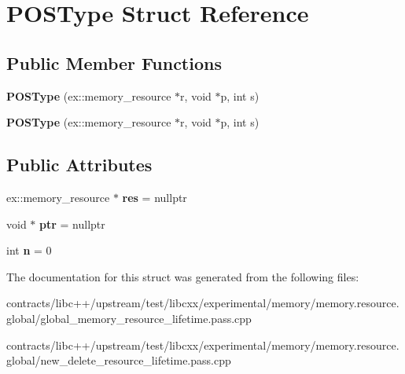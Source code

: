 \hypertarget{struct_p_o_s_type}{}\section{P\+O\+S\+Type Struct Reference}
\label{struct_p_o_s_type}
\subsection*{Public Member Functions}
\begin{DoxyCompactItemize}
\item 
\mbox{\label{struct_p_o_s_type_a861c65273f916b01d18f6bb990455d1d}} 
{\bfseries P\+O\+S\+Type} (ex\+::memory\+\_\+resource $\ast$r, void $\ast$p, int s)
\item 
\mbox{\label{struct_p_o_s_type_a861c65273f916b01d18f6bb990455d1d}} 
{\bfseries P\+O\+S\+Type} (ex\+::memory\+\_\+resource $\ast$r, void $\ast$p, int s)
\end{DoxyCompactItemize}
\subsection*{Public Attributes}
\begin{DoxyCompactItemize}
\item 
\mbox{\label{struct_p_o_s_type_a0861cbc4e2c25fa489d199d41638d366}} 
ex\+::memory\+\_\+resource $\ast$ {\bfseries res} = nullptr
\item 
\mbox{\label{struct_p_o_s_type_ace10b2f3f91fabe67aef34e4aeab9540}} 
void $\ast$ {\bfseries ptr} = nullptr
\item 
\mbox{\label{struct_p_o_s_type_af1bf886fae2062be42f78fb8236a28e3}} 
int {\bfseries n} = 0
\end{DoxyCompactItemize}


The documentation for this struct was generated from the following files\+:\begin{DoxyCompactItemize}
\item 
contracts/libc++/upstream/test/libcxx/experimental/memory/memory.\+resource.\+global/global\+\_\+memory\+\_\+resource\+\_\+lifetime.\+pass.\+cpp\item 
contracts/libc++/upstream/test/libcxx/experimental/memory/memory.\+resource.\+global/new\+\_\+delete\+\_\+resource\+\_\+lifetime.\+pass.\+cpp\end{DoxyCompactItemize}
